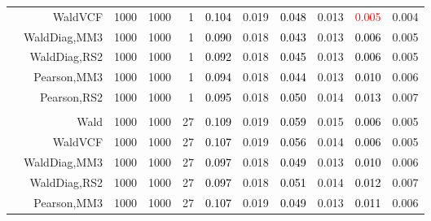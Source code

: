 \documentclass[
]{article}
\begin{document}
\begin{table}[H]
{\begin{tabular}[t]{lrrrrrrrlrr}
\hspace{1em} & WaldVCF & 1000 & 1000 & 1 & \textcolor{black}{0.104} & 0.019 & \textcolor{black}{0.048} & 0.013 & \textcolor{red}{0.005} & 0.004\\

\hspace{1em} & WaldDiag,MM3 & 1000 & 1000 & 1 & \textcolor{black}{0.090} & 0.018 & \textcolor{black}{0.043} & 0.013 & \textcolor{black}{0.006} & 0.005\\

\hspace{1em} & WaldDiag,RS2 & 1000 & 1000 & 1 & \textcolor{black}{0.092} & 0.018 & \textcolor{black}{0.045} & 0.013 & \textcolor{black}{0.006} & 0.005\\

\hspace{1em} & Pearson,MM3 & 1000 & 1000 & 1 & \textcolor{black}{0.094} & 0.018 & \textcolor{black}{0.044} & 0.013 & \textcolor{black}{0.010} & 0.006\\

\hspace{1em} & Pearson,RS2 & 1000 & 1000 & 1 & \textcolor{black}{0.095} & 0.018 & \textcolor{black}{0.050} & 0.014 & \textcolor{black}{0.013} & 0.007\\
\cmidrule{1-11}
\addlinespace[0.3em]
\multicolumn{11}{l}{\textbf{1F 15V}}\\
\hspace{1em} & Wald & 1000 & 1000 & 27 & \textcolor{black}{0.109} & 0.019 & \textcolor{black}{0.059} & 0.015 & \textcolor{black}{0.006} & 0.005\\

\hspace{1em} & WaldVCF & 1000 & 1000 & 27 & \textcolor{black}{0.107} & 0.019 & \textcolor{black}{0.056} & 0.014 & \textcolor{black}{0.006} & 0.005\\

\hspace{1em} & WaldDiag,MM3 & 1000 & 1000 & 27 & \textcolor{black}{0.097} & 0.018 & \textcolor{black}{0.049} & 0.013 & \textcolor{black}{0.010} & 0.006\\

\hspace{1em} & WaldDiag,RS2 & 1000 & 1000 & 27 & \textcolor{black}{0.097} & 0.018 & \textcolor{black}{0.051} & 0.014 & \textcolor{black}{0.012} & 0.007\\

\hspace{1em} & Pearson,MM3 & 1000 & 1000 & 27 & \textcolor{black}{0.107} & 0.019 & \textcolor{black}{0.049} & 0.013 & \textcolor{black}{0.011} & 0.006\\


\end{tabular}}
\end{table}
\end{document}
